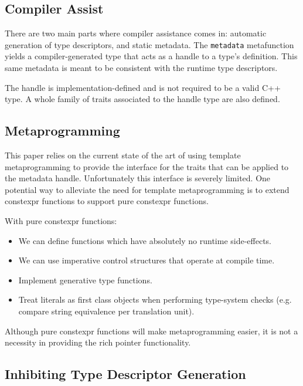 \subsection{Compiler Assist}

There are two main parts where compiler assistance comes in: automatic
generation of type descriptors, and static metadata. The \verb+metadata+
metafunction yields a compiler-generated type that acts as a handle to a
type's definition. This same metadata is meant to be consistent with the
runtime type descriptors.

The handle is implementation-defined and is not required to be a valid C++
type. A whole family of traits associated to the handle type are also defined.

\subsection{Metaprogramming}

This paper relies on the current state of the art of using template metaprogramming to provide the interface for the traits that can be applied to the metadata handle. Unfortunately this interface is severely limited. One potential way to alleviate the need for template metaprogramming is to extend constexpr functions to support pure constexpr functions.

With pure constexpr functions:

\begin{itemize}

  \item We can define functions which have absolutely no runtime side-effects.

  \item We can use imperative control structures that operate at compile time.

  \item Implement generative type functions.

  \item Treat literals as first class objects when performing type-system checks (e.g. compare string equivalence per translation unit).

\end{itemize}

Although pure constexpr functions will make metaprogramming easier, it is not a necessity in providing the rich pointer functionality.

\subsection{Inhibiting Type Descriptor Generation}

